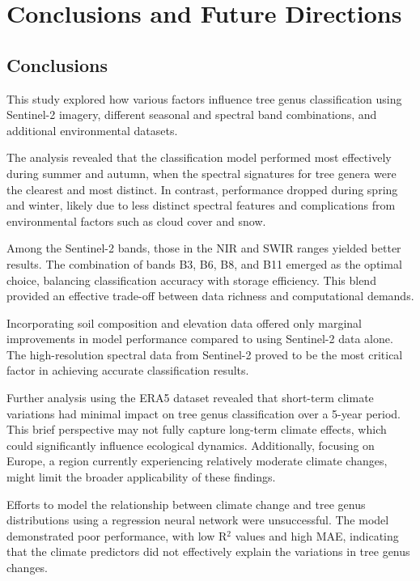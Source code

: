 \chapter{Conclusions and Future Directions}
\label{chapter:conclusion}
\section{Conclusions}


This study explored how various factors influence tree genus classification using Sentinel-2 imagery, different seasonal and spectral band combinations, and additional environmental datasets.

The analysis revealed that the classification model performed most effectively during summer and autumn, when the spectral signatures for tree genera were the clearest and most distinct. In contrast, performance dropped during spring and winter, likely due to less distinct spectral features and complications from environmental factors such as cloud cover and snow.

Among the Sentinel-2 bands, those in the NIR and SWIR ranges yielded better results. The combination of bands B3, B6, B8, and B11 emerged as the optimal choice, balancing classification accuracy with storage efficiency. This blend provided an effective trade-off between data richness and computational demands.

Incorporating soil composition and elevation data offered only marginal improvements in model performance compared to using Sentinel-2 data alone. The high-resolution spectral data from Sentinel-2 proved to be the most critical factor in achieving accurate classification results.

Further analysis using the ERA5 dataset revealed that short-term climate variations had minimal impact on tree genus classification over a 5-year period. This brief perspective may not fully capture long-term climate effects, which could significantly influence ecological dynamics. Additionally, focusing on Europe, a region currently experiencing relatively moderate climate changes, might limit the broader applicability of these findings.

Efforts to model the relationship between climate change and tree genus distributions using a regression neural network were unsuccessful. The model demonstrated poor performance, with low R$^2$ values and high MAE, indicating that the climate predictors did not effectively explain the variations in tree genus changes.

